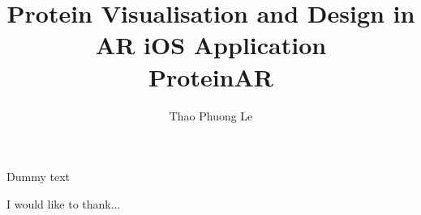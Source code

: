 \documentclass[MSCIM]{mscim}
\begin{document}

\title{Protein Visualisation and Design in AR iOS Application \\ \textbf{ProteinAR}}
\author{Thao Phuong Le}

\beforeabstract

Dummy text

\afterabstract


 I would like to thank...
 
 
\afterpreface







%
%




\printbibliography
\end{document}
